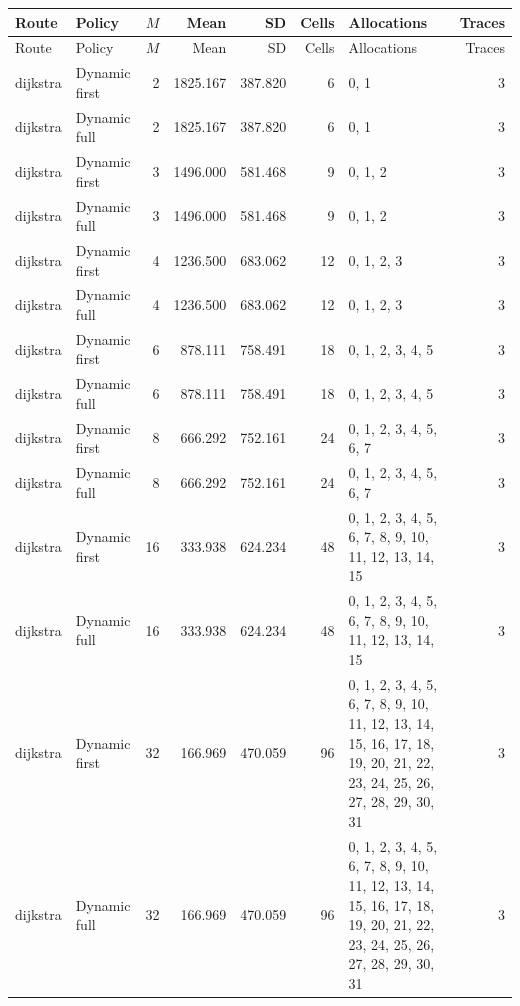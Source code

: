 \documentclass[10pt,a4paper]{article}
\begin{document}
\tiny\setlength{\tabcolsep}{2pt}\begin{longtable}{@{}p{23mm}p{29mm}rrrrp{36mm}r@{}}
\toprule Route & Policy & $M$ & Mean & SD & Cells & Allocations & Traces \\ \midrule\endfirsthead
\toprule Route & Policy & $M$ & Mean & SD & Cells & Allocations & Traces \\ \midrule\endhead
\bottomrule\endfoot
dijkstra & Dynamic first & 2 & 1825.167 & 387.820 & 6 & 0, 1 & 3 \\
dijkstra & Dynamic full & 2 & 1825.167 & 387.820 & 6 & 0, 1 & 3 \\
dijkstra & Dynamic first & 3 & 1496.000 & 581.468 & 9 & 0, 1, 2 & 3 \\
dijkstra & Dynamic full & 3 & 1496.000 & 581.468 & 9 & 0, 1, 2 & 3 \\
dijkstra & Dynamic first & 4 & 1236.500 & 683.062 & 12 & 0, 1, 2, 3 & 3 \\
dijkstra & Dynamic full & 4 & 1236.500 & 683.062 & 12 & 0, 1, 2, 3 & 3 \\
dijkstra & Dynamic first & 6 & 878.111 & 758.491 & 18 & 0, 1, 2, 3, 4, 5 & 3 \\
dijkstra & Dynamic full & 6 & 878.111 & 758.491 & 18 & 0, 1, 2, 3, 4, 5 & 3 \\
dijkstra & Dynamic first & 8 & 666.292 & 752.161 & 24 & 0, 1, 2, 3, 4, 5, 6, 7 & 3 \\
dijkstra & Dynamic full & 8 & 666.292 & 752.161 & 24 & 0, 1, 2, 3, 4, 5, 6, 7 & 3 \\
dijkstra & Dynamic first & 16 & 333.938 & 624.234 & 48 & 0, 1, 2, 3, 4, 5, 6, 7, 8, 9, 10, 11, 12, 13, 14, 15 & 3 \\
dijkstra & Dynamic full & 16 & 333.938 & 624.234 & 48 & 0, 1, 2, 3, 4, 5, 6, 7, 8, 9, 10, 11, 12, 13, 14, 15 & 3 \\
dijkstra & Dynamic first & 32 & 166.969 & 470.059 & 96 & 0, 1, 2, 3, 4, 5, 6, 7, 8, 9, 10, 11, 12, 13, 14, 15, 16, 17, 18, 19, 20, 21, 22, 23, 24, 25, 26, 27, 28, 29, 30, 31 & 3 \\
dijkstra & Dynamic full & 32 & 166.969 & 470.059 & 96 & 0, 1, 2, 3, 4, 5, 6, 7, 8, 9, 10, 11, 12, 13, 14, 15, 16, 17, 18, 19, 20, 21, 22, 23, 24, 25, 26, 27, 28, 29, 30, 31 & 3 \\
\end{longtable}\normalsize\setlength{\tabcolsep}{6pt}
\clearpage
\end{document}
